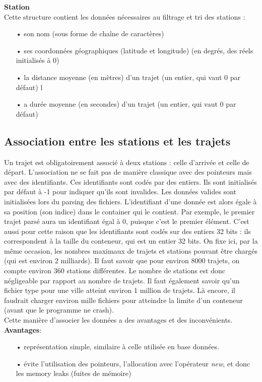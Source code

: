 \documentclass[12pt]{article}
\begin{document}
		\textbf{Station}\\
		Cette structure contient les données nécessaires au filtrage et tri des stations :\\
		\begin{itemize}
			\item[•]son nom (sous forme de chaîne de caractères)
			\item[•]ses coordonnées géographiques (latitude et longitude) (en degrés,
			des réels initialisés à 0)
			\item[•]la distance moyenne (en mètres) d’un trajet (un entier, qui vaut 0 par défaut)
			l\item[•]a durée moyenne (en secondes) d’un trajet (un entier, qui vaut 0 par défaut)
		\end{itemize}
			
		\subsection{Association entre les stations et les trajets}
		Un trajet est obligatoirement associé à deux stations : celle d’arrivée et celle de départ.
	L’association ne se fait pas de manière classique avec des pointeurs mais avec des identifiants. Ces identifiants sont codés par des entiers. Ils sont initialisés par défaut à -1 pour indiquer qu’ils sont invalides. Les données valides sont initialisées lors du parsing des fichiers. L’identifiant d’une donnée est alors égale à sa position (son indice) dans le container qui le contient. Par exemple, le premier trajet parsé aura un identifiant égal à 0, puisque c’est le premier élément. C’est aussi pour cette raison que les identifiants sont codés sur des entiers 32 bits : ils correspondent à la taille du conteneur, qui est un entier 32 bits. On fixe ici, par la même occasion, les nombres maximaux de trajets et stations pouvant être chargés (qui est environ 2 milliards). Il faut savoir que pour environ 8000 trajets, on compte environ 360 stations différentes. Le nombre de stations est donc négligeable par rapport au nombre de trajets. Il faut également savoir qu’un fichier type pour une ville atteint environ 1 million de trajets. Là encore, il faudrait charger environ mille fichiers pour atteindre la limite d’un conteneur (avant que le programme ne crash).\\
	
	Cette manière d’associer les données a des avantages et des inconvénients.\\
			
		\textbf{Avantages}:
		\begin{itemize}
			\item[•] représentation simple, similaire à celle utilisée en base données.
			\item[•] évite l'utilisation des pointeurs, l’allocation avec l’opérateur \textit{new}, et donc les memory leaks (fuites de mémoire)
		\end{itemize}
			
\end{document}
